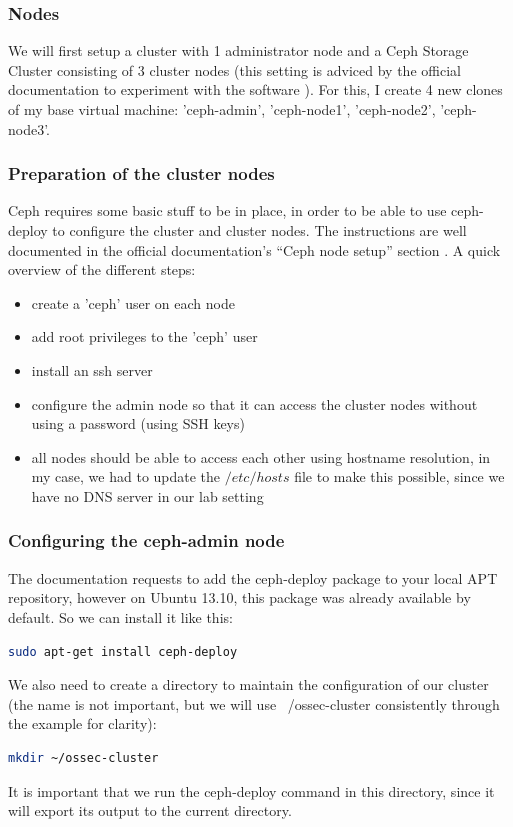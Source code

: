 \documentclass[12pt]{report}
\begin{document}
\subsubsection{Nodes}
We will first setup a cluster with 1 administrator node and a Ceph
Storage Cluster consisting of 3 cluster nodes (this setting is adviced
by the official documentation to experiment with the software \cite{ceph_official_doc}).
For this, I create 4 new clones of my base virtual machine:
'ceph-admin', 'ceph-node1', 'ceph-node2', 'ceph-node3'.

\subsubsection{Preparation of the cluster nodes}
Ceph requires some basic stuff to be in place, in order to be able to
use ceph-deploy to configure the cluster and cluster nodes.
The instructions are well documented in the official documentation's
``Ceph node setup'' section \cite{ceph_official_doc}.
A quick overview of the different steps:
\begin{itemize}
\item create a 'ceph' user on each node
\item add root privileges to the 'ceph' user
\item install an ssh server
\item configure the admin node so that it can access the cluster nodes
  without using a password (using SSH keys)
\item all nodes should be able to access each other using hostname
  resolution, in my case, we had to update the $/etc/hosts$ file to
  make this possible, since we have no DNS server in our lab setting
\end{itemize}

\subsubsection{Configuring the ceph-admin node}
The documentation requests to add the ceph-deploy package to your
local APT
repository, however on Ubuntu 13.10, this package was already
available by default.
So we can install it like this:
\begin{lstlisting}[language=bash]
sudo apt-get install ceph-deploy
\end{lstlisting}
We also need to create a directory to maintain the configuration of
our cluster (the name is not important, but we will use
~/ossec-cluster consistently through the example for clarity):
\begin{lstlisting}[language=bash]
mkdir ~/ossec-cluster
\end{lstlisting}
It is important that we run  the ceph-deploy command in this
directory, since it will export its output to the current directory.
\end{document}
